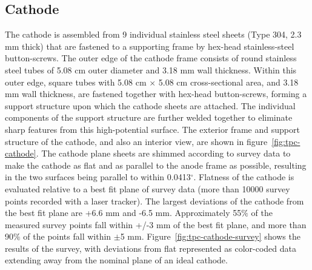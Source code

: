 \subsection{Cathode}
The cathode is assembled from 9 individual stainless steel sheets (Type 304, 2.3 mm thick) that are fastened to a supporting frame by hex-head stainless-steel button-screws. The outer edge of the cathode frame consists of round stainless steel tubes of 5.08 cm outer diameter and 3.18 mm wall thickness.  Within this outer edge, square tubes with 5.08 cm $\times$ 5.08 cm cross-sectional area, and 3.18 mm wall thickness, are fastened together with hex-head button-screws, forming a support structure upon which the cathode sheets are attached.  The individual components of the support structure are further welded together to eliminate sharp features from this high-potential surface.  The exterior frame and support structure of the cathode, and also an interior view, are shown in figure~\ref{fig:tpc-cathode}. The cathode plane sheets are shimmed according to survey data to make the cathode as flat and as parallel to the anode frame as possible, resulting in the two surfaces being parallel to within 0.0413$^{\circ}$.  Flatness of the cathode is evaluated relative to a best fit plane of survey data (more than 10000 survey points recorded with a laser tracker). The largest deviations of the cathode from the best fit plane are +6.6 mm and -6.5 mm. Approximately 55$\%$ of the measured survey points fall within +/-3 mm of the best fit plane, and more than 90$\%$ of the points fall within $\pm$5 mm.  Figure~\ref{fig:tpc-cathode-survey} shows the results of the survey, with deviations from flat represented as color-coded data extending away from the nominal plane of an ideal cathode. %

